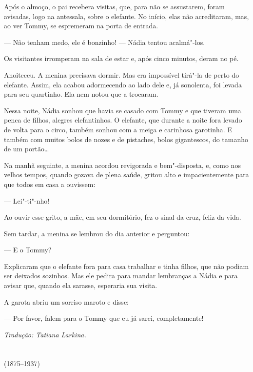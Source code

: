 Após o almoço, o pai recebera visitas, que, para não se assustarem,
foram avisadas, logo na antessala, sobre o elefante. No início, elas não
acreditaram, mas, ao ver Tommy, se espremeram na porta de entrada.

--- Não tenham medo, ele é bonzinho! --- Nádia tentou acalmá"-los.

Os visitantes irromperam na sala de estar e, após cinco minutos, deram
no pé.

Anoiteceu. A menina precisava dormir. Mas era impossível tirá"-la de
perto do elefante. Assim, ela acabou adormecendo ao lado dele e, já
sonolenta, foi levada para seu quartinho. Ela nem notou que a trocaram.

Nessa noite, Nádia sonhou que havia se casado com Tommy e que tiveram
uma penca de filhos, alegres elefantinhos. O elefante, que durante a
noite fora levado de volta para o circo, também sonhou com a meiga e
carinhosa garotinha. E também com muitos bolos de nozes e de pistaches,
bolos gigantescos, do tamanho de um portão\ldots{}

Na manhã seguinte, a menina acordou revigorada e bem"-disposta, e, como
nos velhos tempos, quando gozava de plena saúde, gritou alto e
impacientemente para que todos em casa a ouvissem:

--- Lei"-ti"-nho!

Ao ouvir esse grito, a mãe, em seu dormitório, fez o sinal da cruz,
feliz da vida.

Sem tardar, a menina se lembrou do dia anterior e perguntou:

--- E o Tommy?

Explicaram que o elefante fora para casa trabalhar e tinha filhos, que
não podiam ser deixados sozinhos. Mas ele pedira para mandar lembranças
a Nádia e para avisar que, quando ela sarasse, esperaria sua visita.

A garota abriu um sorriso maroto e disse:

--- Por favor, falem para o Tommy que eu já sarei, completamente!

\medskip

{\footnotesize\hfill\emph{Tradução: Tatiana Larkina.}}

\chapter*{}
\label{part12}
\thispagestyle{empty}

\begin{vplace}[1.5]
{\HUGES\hfill{}}

{\LARGE\hfill\textlt(1875–1937)}
\end{vplace}

